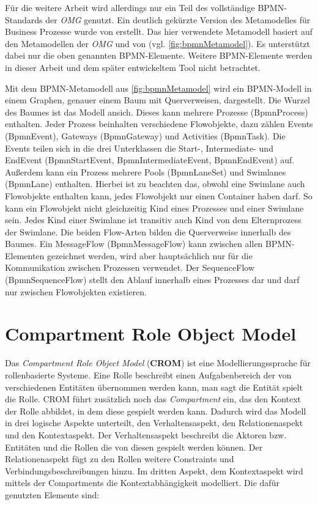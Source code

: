 Für die weitere Arbeit wird allerdings nur ein Teil des vollständige BPMN-Standards der \emph{OMG} genutzt.
Ein deutlich gekürzte Version des Metamodelles für Business Prozesse wurde von \cite{Loja2010} erstellt.
Das hier verwendete Metamodell basiert auf den Metamodellen der \emph{OMG} und von \cite{Loja2010} (vgl. \cref{fig:bpmnMetamodel}).
Es unterstützt dabei nur die oben genannten BPMN-Elemente.
Weitere BPMN-Elemente werden in dieser Arbeit und dem später entwickeltem Tool nicht betrachtet.

Mit dem BPMN-Metamodell aus \cref{fig:bpmnMetamodel} wird ein BPMN-Modell in einem Graphen, genauer einem Baum mit Querverweisen, dargestellt.
Die Wurzel des Baumes ist das Modell ansich.
Dieses kann mehrere Prozesse (BpmnProcess) enthalten.
Jeder Prozess beinhalten verschiedene Flowobjekte, dazu zählen Events (BpmnEvent), Gateways (BpmnGateway) und Activities (BpmnTask).
Die Events teilen sich in die drei Unterklassen die Start-, Intermediate- und EndEvent (BpmnStartEvent, BpmnIntermediateEvent, BpmnEndEvent) auf.
Außerdem kann ein Prozess mehrere Pools (BpmnLaneSet) und Swimlanes (BpmnLane) enthalten.
Hierbei ist zu beachten das, obwohl eine Swimlane auch Flowobjekte enthalten kann, jedes Flowobjekt nur einen Container haben darf.
So kann ein Flowobjekt nicht gleichzeitig Kind eines Prozesses und einer Swimlane sein.
Jedes Kind einer Swimlane ist transitiv auch Kind von dem Elternprozess der Swimlane.
Die beiden Flow-Arten bilden die Querverweise innerhalb des Baumes.
Ein MessageFlow (BpmnMessageFlow) kann zwischen allen BPMN-Elementen gezeichnet werden, wird aber hauptsächlich nur für die Kommunikation zwischen Prozessen verwendet.
Der SequenceFlow (BpmnSequenceFlow) stellt den Ablauf innerhalb eines Prozesses dar und darf nur zwischen Flowobjekten existieren.

\section{Compartment Role Object Model}

Das \emph{Compartment Role Object Model} (\textbf{CROM}) ist eine Modellierungssprache für rollenbasierte Systeme.
Eine Rolle beschreibt einen Aufgabenbereich der von verschiedenen Entitäten übernommen werden kann, man sagt die Entität spielt die Rolle.
CROM führt zusätzlich noch das \emph{Compartment} ein, das den Kontext der Rolle abbildet, in dem diese gespielt werden kann.
Dadurch wird das Modell in drei logische Aspekte unterteilt, den Verhaltensaspekt, den Relationenaspekt und den Kontextaspekt.
Der Verhaltensaspekt beschreibt die Aktoren bzw. Entitäten und die Rollen die von diesen gespielt werden können.
Der Relationenaspekt fügt zu den Rollen weitere Constraints und Verbindungsbeschreibungen hinzu.
Im dritten Aspekt, dem Kontextaspekt wird mittels der Compartments die Kontextabhängigkeit modelliert.
Die dafür genutzten Elemente sind:

